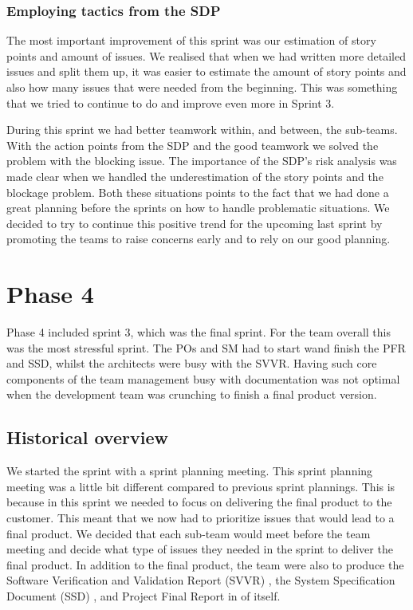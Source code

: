 \documentclass{article}
\begin{document}
\subsubsection{Employing tactics from the SDP}
The most important improvement of this sprint was our estimation of story points and amount of issues. We realised that when we had written more detailed issues and split them up, it was easier to estimate the amount of story points and also how many issues that were needed from the beginning. This was something that we tried to continue to do and improve even more in Sprint 3. 

During this sprint we had better teamwork within, and between, the sub-teams. With the action points from the SDP and the good teamwork we solved the problem with the blocking issue. The importance of the SDP's risk analysis was made clear when we handled the underestimation of the story points and the blockage problem. Both these situations points to the fact that we had done a great planning before the sprints on how to handle problematic situations. We decided to try to continue this positive trend for the upcoming last sprint by promoting the teams to raise concerns early and to rely on our good planning.

\section{Phase 4} %
Phase 4 included sprint 3, which was the final sprint. For the team overall this was the most stressful sprint. The POs and SM had to start wand finish the PFR and SSD\cite{SSD}, whilst the architects were busy with the SVVR\cite{SVVR}. Having such core components of the team management busy with documentation was not optimal when the development team was crunching to finish a final product version. 

\subsection{Historical overview}
We started the sprint with a sprint planning meeting. This sprint planning meeting was a little bit different compared to previous sprint plannings. This is because in this sprint we needed to focus on delivering the final product to the customer. This meant that we now had to prioritize issues that would lead to a final product. We decided that each sub-team would meet before the team meeting and decide what type of issues they needed in the sprint to deliver the final product. In addition to the final product, the team were also to produce the Software Verification and Validation Report (SVVR) \cite{SVVR}, the System Specification Document (SSD) \cite{SSD}, and Project Final Report in of itself.
\end{document}
